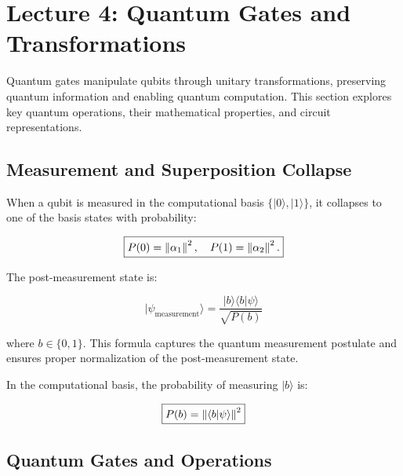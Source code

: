 \section{Lecture 4: Quantum Gates and Transformations}

Quantum gates manipulate qubits through unitary transformations, preserving
quantum information and enabling quantum computation. This section explores
key quantum operations, their mathematical properties, and circuit
representations.


\subsection*{Measurement and Superposition Collapse}

When a qubit is measured in the computational basis $\{|0\rangle,
|1\rangle\}$, it collapses to one of the basis states with probability:

\[
  \boxed{
    P(0) = \left\lVert\alpha_1\right\rVert^2, \quad P(1) = \left\lVert\alpha_2\right\rVert^2.
  }
\]

The post-measurement state is:

\[
  \boxed{
    |\psi_{\text{measurement}}\rangle = \frac{|b\rangle \langle b | \psi
    \rangle}{\sqrt{P(b)}}
  }
\]

\noindent
where $b \in \{0,1\}$. This formula captures the quantum measurement
postulate and ensures proper normalization of the post-measurement state.

\vspace{0.3cm}

In the computational basis, the probability of measuring $|b\rangle$ is:

\[
  \boxed{
    P(b) = \left\lVert\langle b | \psi \rangle\right\rVert^2
  }
\]


\subsection*{Quantum Gates and Operations}

